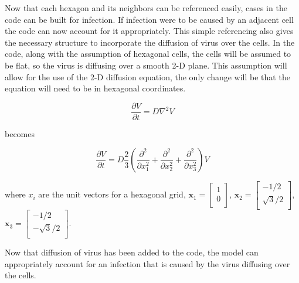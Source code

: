 \documentclass[a4paper]{article}
\begin{document}
Now that each hexagon and its neighbors can be referenced easily, cases in the code can be built for infection. If infection were to be caused by an adjacent cell the code can now account for it appropriately. This simple referencing also gives the necessary structure to incorporate the diffusion of virus over the cells. In the code, along with the assumption of hexagonal cells, the cells will be assumed to be flat, so the virus is diffusing over a smooth 2-D plane. This assumption will allow for the use of the 2-D diffusion equation, the only change will be that the equation will need to be in hexagonal coordinates. 

$$\frac{\partial V}{\partial t} = D\nabla^{2}V$$

\noindent
becomes 

$$\frac{\partial V}{\partial t} = D\frac{2}{3} \left (\frac{\partial^2}{\partial x^2_1}+\frac{\partial^2}{\partial x^2_2}+\frac{\partial^2}{\partial x^2_3}\right )V$$ 

\noindent
where $x_i$ are the unit vectors for a hexagonal grid, 
$\textbf{x}_1=
\left [
    \begin{array}{c}
        1 \\
        0 \\
    \end{array}
\right ]$, 
$\textbf{x}_2=
\left [
    \begin{array}{c}
        -1/2 \\
        \sqrt{3}/2 \\
    \end{array}
\right ]$, 
$\textbf{x}_3=
\left [
    \begin{array}{c}
        -1/2 \\
        -\sqrt{3}/2 \\
    \end{array}
\right ]$.

\noindent
Now that diffusion of virus has been added to the code, the model can appropriately account for an infection that is caused by the virus diffusing over the cells.
\\
\end{document}
